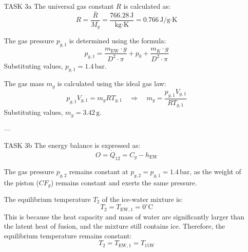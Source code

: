 TASK 3a  
The universal gas constant \( R \) is calculated as:  
\[
R = \frac{\bar{R}}{M_g} = \frac{766.28 \, \text{J}}{\text{kg·K}} = 0.766 \, \text{J}/\text{g·K}
\]

The gas pressure \( p_{g,1} \) is determined using the formula:  
\[
p_{g,1} = \frac{m_{\text{EW}} \cdot g}{D^2 \cdot \pi} + p_0 + \frac{m_K \cdot g}{D^2 \cdot \pi}
\]  
Substituting values, \( p_{g,1} = 1.4 \, \text{bar} \).

The gas mass \( m_g \) is calculated using the ideal gas law:  
\[
p_{g,1} V_{g,1} = m_g R T_{g,1} \quad \Rightarrow \quad m_g = \frac{p_{g,1} V_{g,1}}{R T_{g,1}}
\]  
Substituting values, \( m_g = 3.42 \, \text{g} \).

---

TASK 3b  
The energy balance is expressed as:  
\[
O = \dot{Q}_{12} = C_g - h_{\text{EW}}
\]

The gas pressure \( p_{g,2} \) remains constant at \( p_{g,2} = p_{g,1} = 1.4 \, \text{bar} \), as the weight of the piston (\( CF_g \)) remains constant and exerts the same pressure.

The equilibrium temperature \( T_2 \) of the ice-water mixture is:  
\[
T_2 = T_{\text{EW},1} = 0^\circ\text{C}
\]  
This is because the heat capacity and mass of water are significantly larger than the latent heat of fusion, and the mixture still contains ice. Therefore, the equilibrium temperature remains constant:  
\[
T_2 = T_{\text{EW},1} = T_{\text{15W}}
\]